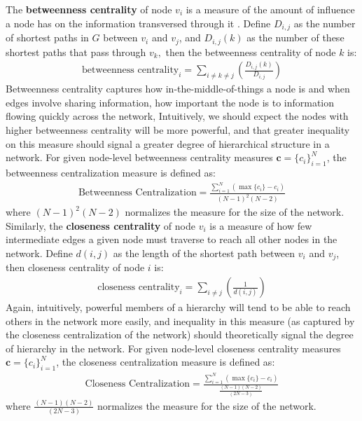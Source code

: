 \documentclass[3p,times]{elsarticle}
\begin{document}
The \textbf{betweenness centrality} of node $v_{i}$ is a measure of the amount of influence a node has on the information transversed through it \cite{freeman1977set}. Define $D_{i,j}$ as the number of shortest paths in $G$ between $v_{i}$ and $v_{j}$, and $D_{i,j}(k)$ as the number of these shortest paths that pass through $v_{k},$ then the betweenness centrality of node $k$ is:
\begin{align}
	\text{betweenness centrality}_i = \sum_{i\neq k\neq j}{(\frac{D_{i,j}(k)}{D_{i,j}})}
\end{align}
Betweenness centrality captures how in-the-middle-of-things a node is and when edges involve sharing information, how important the node is to information flowing quickly across the network, Intuitively, we should expect the nodes with higher betweenness centrality will be more powerful, and that greater inequality on this measure should signal a greater degree of hierarchical structure in a network. For given node-level betweenness centrality measures $\mathbf{c} = \{c_i\}_{i=1}^N$, the betweenness centralization measure is defined as: 
\begin{align}
	\text{Betweenness Centralization} = \frac{\sum_{i=1}^{N}{(\max\{c_{i}\}-c_{i})}}{(N-1)^2(N-2)}
\end{align}
where $(N-1)^2(N-2)$ normalizes the measure for the size of the network. Similarly, the \textbf{closeness centrality} of node $v_{i}$ is a measure of how few intermediate edges a given node must traverse to reach all other nodes in the network. Define $d(i,j)$ as the length of the shortest path between $v_{i}$ and $v_{j}$, then closeness centrality of node $i$ is: 
\begin{align}
	\text{closeness centrality}_i = \sum_{i\neq j}{(\frac{1}{d(i,j)})}
\end{align}
Again, intuitively, powerful members of a hierarchy will tend to be able to reach others in the network more easily, and inequality in this measure (as captured by the closeness centralization of the network) should theoretically signal the degree of hierarchy in the network. For given node-level closeness centrality measures $\mathbf{c} = \{c_i\}_{i=1}^N$, the closeness centralization measure is defined as: 
\begin{align}
	\text{Closeness Centralization} = \frac{\sum_{i=1}^{N}{(\max\{c_{i}\}-c_{i})}}{\frac{(N-1)(N-2)}{(2N-3)}}
\end{align}
where $\frac{(N-1)(N-2)}{(2N-3)}$ normalizes the measure for the size of the network.
\end{document}
